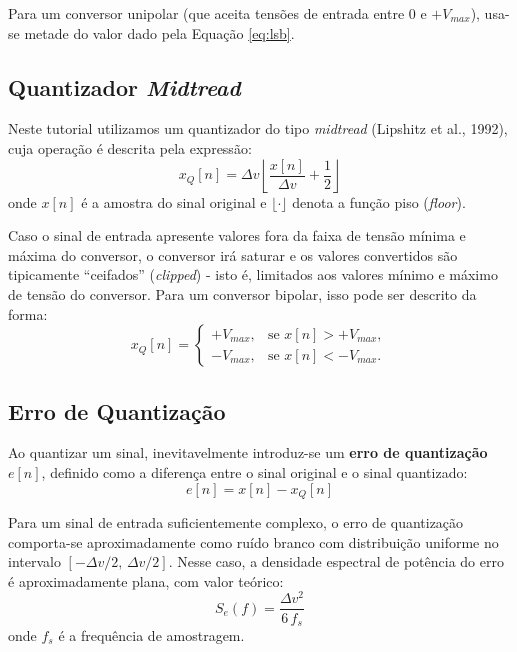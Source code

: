\documentclass[a4paper,twoside,12pt]{article}
\begin{document}
	Para um conversor unipolar (que aceita tensões de entrada entre $0$ e $+V_{max}$), usa-se metade do valor dado pela Equação \ref{eq:lsb}.
	
	\subsection{Quantizador \textit{Midtread}}
	
	Neste tutorial utilizamos um quantizador do tipo \textit{midtread} (Lipshitz et al., 1992), cuja operação é descrita pela expressão:
	\begin{equation}
		x_Q[n] = \Delta v \left\lfloor \frac{x[n]}{\Delta v} + \frac{1}{2}
		\right\rfloor
		\label{eq:midtread}
	\end{equation}
	onde $x[n]$ é a amostra do sinal original e $\lfloor \cdot \rfloor$ denota a função piso (\textit{floor}).
	
	Caso o sinal de entrada apresente valores fora da faixa de tensão mínima e máxima do conversor, o conversor irá saturar e os valores convertidos são tipicamente ``ceifados'' (\emph{clipped}) - isto é, limitados aos valores mínimo e máximo de tensão do conversor. Para um conversor bipolar, isso pode ser descrito da forma:
	\begin{equation}
		x_Q[n] = 
		\begin{cases}
			+V_{max}, & \text{se } x[n] > +V_{max}, \\
			-V_{max}, & \text{se } x[n] < -V_{max}.
		\end{cases}
		\label{eq:clipping}
	\end{equation}
	
	\subsection{Erro de Quantização}
	
	Ao quantizar um sinal, inevitavelmente introduz-se um \textbf{erro de quantização} $e[n]$, definido como a diferença entre o sinal original e o sinal quantizado:
	\begin{equation}
		e[n] = x[n] - x_Q[n]
		\label{eq:erro}
	\end{equation}
	
	Para um sinal de entrada suficientemente complexo, o erro de quantização comporta-se aproximadamente como ruído branco com distribuição uniforme no intervalo $[-\Delta v/2,\, \Delta v/2]$. Nesse caso, a densidade espectral de potência do erro é aproximadamente plana, com valor teórico:
	\begin{equation}
		S_e(f) = \frac{\Delta v^2}{6\,f_s}
		\label{eq:psd_erro}
	\end{equation}
	onde $f_s$ é a frequência de amostragem.
	
\end{document}

